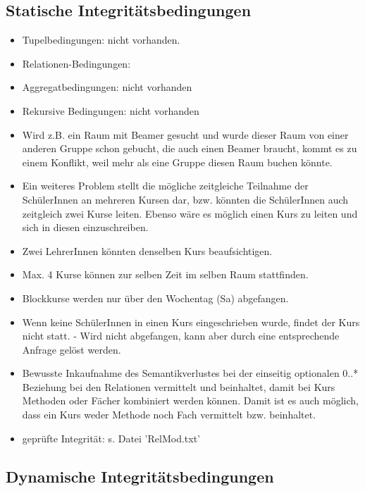 \documentclass[fleqn]{scrartcl}
\begin{document}
\subsection{Statische Integritätsbedingungen} 
\begin{itemize}
\item Tupelbedingungen: nicht vorhanden.
\item Relationen-Bedingungen: 
\item Aggregatbedingungen: nicht vorhanden
\item Rekursive Bedingungen: nicht vorhanden

\item Wird z.B. ein Raum mit Beamer gesucht und wurde dieser Raum von einer anderen Gruppe schon gebucht, die auch einen Beamer braucht, kommt es zu einem Konflikt, weil mehr als eine Gruppe diesen Raum buchen könnte. 

\item Ein weiteres Problem stellt die mögliche zeitgleiche Teilnahme der SchülerInnen an mehreren Kursen dar, bzw. könnten die SchülerInnen auch zeitgleich zwei Kurse leiten. Ebenso wäre es möglich einen Kurs zu leiten und sich in diesen einzuschreiben. 

\item Zwei LehrerInnen könnten denselben Kurs beaufsichtigen.

\item Max. 4 Kurse können zur selben Zeit im selben Raum stattfinden. 

\item Blockkurse werden nur über den Wochentag (Sa) abgefangen. 

\item Wenn keine SchülerInnen in einen Kurs eingeschrieben wurde, findet der Kurs nicht statt. - Wird nicht abgefangen, kann aber durch eine entsprechende Anfrage gelöst werden.

\item Bewusste Inkaufnahme des Semantikverlustes bei der einseitig optionalen 0..* Beziehung bei den Relationen vermittelt und beinhaltet, damit bei Kurs Methoden oder Fächer kombiniert werden können. Damit ist es auch möglich, dass ein Kurs weder Methode noch Fach vermittelt bzw. beinhaltet.
 
\item geprüfte Integrität: s. Datei 'RelMod.txt'

\end{itemize}
\subsection{Dynamische Integritätsbedingungen} 
\end{document}
